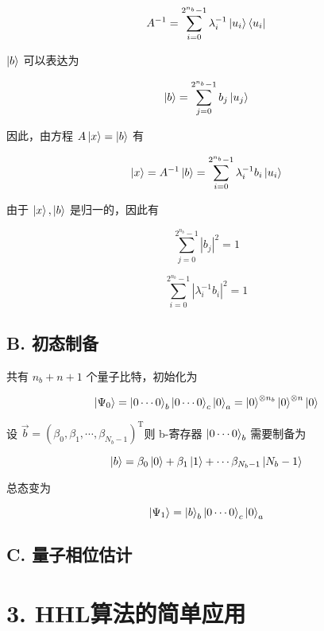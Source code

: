 \documentclass[aps,prl,twocolumn,groupedaddress]{revtex4-2}
\begin{document}
$$
A^{-1} = \sum_{i=0}^{2^{n_b}-1} \lambda_i^{-1} \ket{u_i}\bra{u_i}
$$

$\ket{b}$ 可以表达为

$$
\ket{b} = \sum_{j=0}^{2^{n_b}-1} b_j \ket{u_j}
$$

因此，由方程 $A\ket{x}=\ket{b}$ 有

$$
\ket{x} = A^{-1}\ket{b} = \sum_{i=0}^{2^{n_b}-1} \lambda_i^{-1}b_i \ket{u_i}
$$

由于 $\ket{x},\ket{b}$ 是归一的，因此有

$$
\sum_{j=0}^{2^{n_b}-1}\left|b_j \right|^2 = 1
$$

$$
\sum_{i=0}^{2^{n_b}-1} \left|\lambda_i^{-1}b_i\right|^2 = 1
$$

\subsection{B. 初态制备}

共有 $n_b+n+1$ 个量子比特，初始化为

$$
\ket{\Psi_0}
=\ket{0\cdots 0}_b\ket{0\cdots 0}_c\ket{0}_a
=\ket{0}^{\otimes n_b}\ket{0}^{\otimes n}\ket{0}
$$

设 $\vec{b} = \left(\beta_0,\beta_1,\cdots,\beta_{N_b-1} \right)^{\mathrm{T}} $则 b-寄存器 $\ket{0\cdots 0}_b$ 需要制备为

$$
\ket{b}
=\beta_0\ket{0}+\beta_1\ket{1}+\cdots\beta_{N_b-1}\ket{N_b-1}
$$

总态变为

$$
\ket{\Psi_1}
=\ket{b}_b\ket{0\cdots 0}_c\ket{0}_a
$$

\subsection{C. 量子相位估计}

\section{3. HHL算法的简单应用}


%
\end{document}
